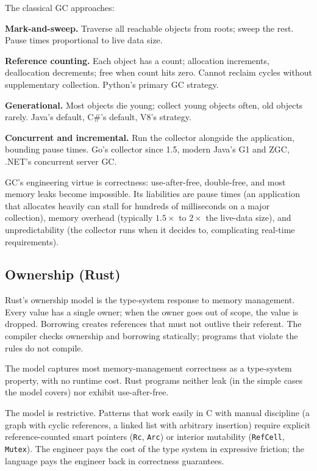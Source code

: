 The classical GC approaches:

\textbf{Mark-and-sweep.} Traverse all reachable objects from roots; sweep the rest. Pause times proportional to live data size.

\textbf{Reference counting.} Each object has a count; allocation increments, deallocation decrements; free when count hits zero. Cannot reclaim cycles without supplementary collection. Python's primary GC strategy.

\textbf{Generational.} Most objects die young; collect young objects often, old objects rarely. Java's default, C\#'s default, V8's strategy.

\textbf{Concurrent and incremental.} Run the collector alongside the application, bounding pause times. Go's collector since 1.5, modern Java's G1 and ZGC, .NET's concurrent server GC.

GC's engineering virtue is correctness: use-after-free, double-free, and most memory leaks become impossible. Its liabilities are pause times (an application that allocates heavily can stall for hundreds of milliseconds on a major collection), memory overhead (typically $1.5\times$ to $2\times$ the live-data size), and unpredictability (the collector runs when it decides to, complicating real-time requirements).

\subsection{Ownership (Rust)}

Rust's ownership model is the type-system response to memory management. Every value has a single owner; when the owner goes out of scope, the value is dropped. Borrowing creates references that must not outlive their referent. The compiler checks ownership and borrowing statically; programs that violate the rules do not compile.

The model captures most memory-management correctness as a type-system property, with no runtime cost. Rust programs neither leak (in the simple cases the model covers) nor exhibit use-after-free.

The model is restrictive. Patterns that work easily in C with manual discipline (a graph with cyclic references, a linked list with arbitrary insertion) require explicit reference-counted smart pointers (\texttt{Rc}, \texttt{Arc}) or interior mutability (\texttt{RefCell}, \texttt{Mutex}). The engineer pays the cost of the type system in expressive friction; the language pays the engineer back in correctness guarantees.

